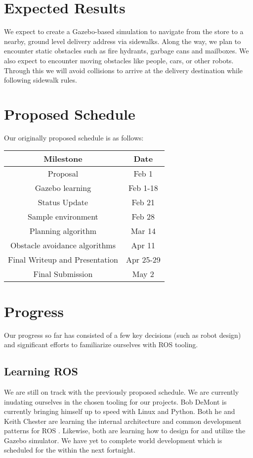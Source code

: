 \documentclass{article}
\begin{document}
\begin{multicols}{2}
\section*{Expected Results}
We expect to create a Gazebo-based simulation to navigate from the store to a nearby, ground level delivery address via sidewalks.  Along the way, we plan to encounter static obstacles such as fire hydrants, garbage cans and mailboxes.  We also expect to encounter moving obstacles like people, cars, or other robots.  Through this we will avoid collisions to arrive at the delivery destination while following sidewalk rules.

\section*{Proposed Schedule}
Our originally proposed schedule is as follows:

\begin{center}
\begin{tabular}{|cc|}
\hline
Milestone & Date  \\
\hline
Proposal  &  Feb 1 \\
Gazebo learning  &  Feb 1-18 \\
Status Update  &  Feb 21 \\
Sample environment & Feb 28\\
Planning algorithm & Mar 14\\
Obstacle avoidance algorithms & Apr 11\\
Final Writeup and Presentation & Apr 25-29\\
Final Submission  &  May 2 \\
\hline
\end{tabular}
\end{center}

\section*{Progress}

Our progress so far has consisted of a few key decisions (such as robot design) and significant efforts to familiarize ourselves with ROS tooling.

\subsection*{Learning ROS}

We are still on track with the previously proposed schedule. We are currently inudating ourselves in the chosen tooling for our projects. Bob DeMont is currently bringing himself up to speed with Linux and Python. Both he and Keith Chester are learning the internal architecture and common development patterns for ROS \cite{Construct}. Likewise, both are learning how to design for and utilize the Gazebo simulator. We have yet to complete world development which is scheduled for the within the next fortnight.


\end{multicols}
\end{document}

